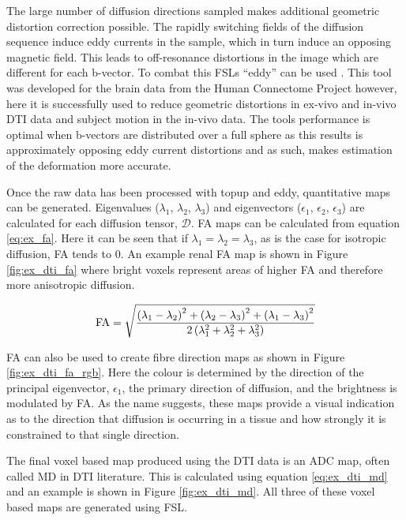 The large number of diffusion directions sampled makes additional geometric distortion correction possible. The rapidly switching fields of the diffusion sequence induce eddy currents in the sample, which in turn induce an opposing magnetic field. This leads to off-resonance distortions in the image which are different for each b-vector. To combat this \ac{FSL}s ``eddy'' can be used \cite{andersson_integrated_2016}. This tool was developed for the brain data from the Human Connectome Project \cite{andersson_non-parametric_2015} however, here it is successfully used to reduce geometric distortions in ex-vivo and in-vivo \ac{DTI} data and subject motion in the in-vivo data. The tools performance is optimal when b-vectors are distributed over a full sphere as this results is approximately opposing eddy current distortions and as such, makes estimation of the deformation more accurate.

Once the raw data has been processed with topup and eddy, quantitative maps can be generated. Eigenvalues ($\lambda_1$, $\lambda_2$, $\lambda_3$) and eigenvectors ($\epsilon_1$, $\epsilon_2$, $\epsilon_3$) are calculated for each diffusion tensor, $\mathscr{D}$. \ac{FA} maps can be calculated from equation \eqref{eq:ex_fa}. Here it can be seen that if $\lambda_1 = \lambda_2 = \lambda_3$, as is the case for isotropic diffusion, \ac{FA} tends to 0. An example renal \ac{FA} map is shown in Figure \ref{fig:ex_dti_fa} where bright voxels represent areas of higher \ac{FA} and therefore more anisotropic diffusion.

\begin{equation}
	\textup{FA} = \sqrt{\frac{\left(\lambda_1 - \lambda_2\right)^2 + \left(\lambda_2 - \lambda_3\right)^2 + \left(\lambda_1 - \lambda_3\right)^2}{2\left( \lambda_1^2 + \lambda_2^2 + \lambda_3^2\right)}}
		\label{eq:ex_fa}
\end{equation}

\ac{FA} can also be used to create fibre direction maps as shown in Figure \ref{fig:ex_dti_fa_rgb}. Here the colour is determined by the direction of the principal eigenvector, $\epsilon_1$, the primary direction of diffusion, and the brightness is modulated by \ac{FA}. As the name suggests, these maps provide a visual indication as to the direction that diffusion is occurring in a tissue and how strongly it is constrained to that single direction.

The final voxel based map produced using the \ac{DTI} data is an \ac{ADC} map, often called \ac{MD} in \ac{DTI} literature. This is calculated using equation \eqref{eq:ex_dti_md} and an example is shown in Figure \ref{fig:ex_dti_md}. All three of these voxel based maps are generated using \ac{FSL}.

